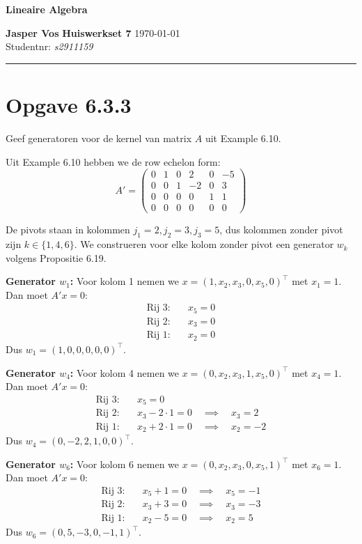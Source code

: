\documentclass{article}
\begin{document}
{\Large \textbf{Lineaire Algebra}}

\bigskip

\textbf{Jasper Vos} \hfill \textbf{Huiswerkset 7} \hfill \today \\
Studentnr: \emph{s2911159}

\rule{\textwidth}{2pt}

\bigskip

\section*{Opgave 6.3.3}
Geef generatoren voor de kernel van matrix $A$ uit Example 6.10.

Uit Example 6.10 hebben we de row echelon form:
\[ A' = \begin{pmatrix}
        0 & 1 & 0 & 2  & 0 & -5 \\
        0 & 0 & 1 & -2 & 0 & 3  \\
        0 & 0 & 0 & 0  & 1 & 1  \\
        0 & 0 & 0 & 0  & 0 & 0
    \end{pmatrix} \]

De pivots staan in kolommen $j_1 = 2, j_2 = 3, j_3 = 5$, dus kolommen zonder pivot zijn $k \in \{1, 4, 6\}$.
We construeren voor elke kolom zonder pivot een generator $w_k$ volgens Propositie 6.19.

\textbf{Generator $w_1$:} Voor kolom 1 nemen we $x = (1, x_2, x_3, 0, x_5, 0)^\top$ met $x_1 = 1$.
Dan moet $A'x = 0$:
\begin{align*}
    \text{Rij 3:} \quad & x_5 = 0 \\
    \text{Rij 2:} \quad & x_3 = 0 \\
    \text{Rij 1:} \quad & x_2 = 0
\end{align*}
Dus $w_1 = (1, 0, 0, 0, 0, 0)^\top$.

\textbf{Generator $w_4$:} Voor kolom 4 nemen we $x = (0, x_2, x_3, 1, x_5, 0)^\top$ met $x_4 = 1$.
Dan moet $A'x = 0$:
\begin{align*}
    \text{Rij 3:} \quad & x_5 = 0                                           \\
    \text{Rij 2:} \quad & x_3 - 2 \cdot 1 = 0 \quad \implies \quad x_3 = 2  \\
    \text{Rij 1:} \quad & x_2 + 2 \cdot 1 = 0 \quad \implies \quad x_2 = -2
\end{align*}
Dus $w_4 = (0, -2, 2, 1, 0, 0)^\top$.

\textbf{Generator $w_6$:} Voor kolom 6 nemen we $x = (0, x_2, x_3, 0, x_5, 1)^\top$ met $x_6 = 1$.
Dan moet $A'x = 0$:
\begin{align*}
    \text{Rij 3:} \quad & x_5 + 1 = 0 \quad \implies \quad x_5 = -1 \\
    \text{Rij 2:} \quad & x_3 + 3 = 0 \quad \implies \quad x_3 = -3 \\
    \text{Rij 1:} \quad & x_2 - 5 = 0 \quad \implies \quad x_2 = 5
\end{align*}
Dus $w_6 = (0, 5, -3, 0, -1, 1)^\top$.
\end{document}
